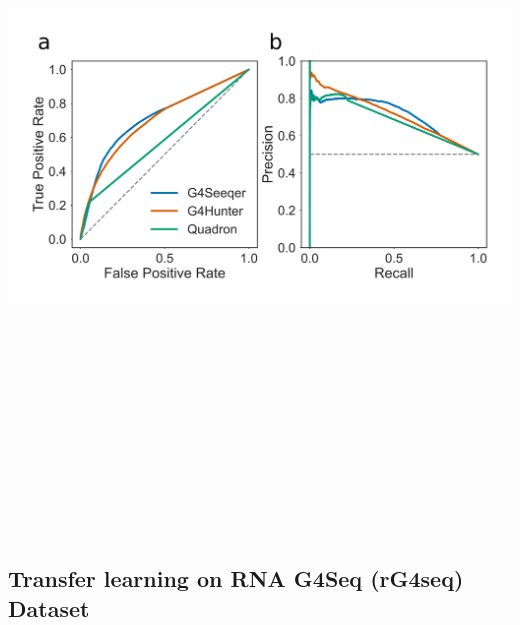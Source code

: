 \documentclass[12pt,a4paper,]{report}
\let\origfigure=\figure
\let\endorigfigure=\endfigure
\renewenvironment{figure}[1][2] {
    \expandafter\origfigure\expandafter[H]
} {
    \endorigfigure
}
\begin{document}
\newpage

\begin{figure}[htbp]
\centering
\includegraphics[width=\textwidth,height=562pt,keepaspectratio]{chapter_3/figures/bg4_roc.png}
\caption[Detection by BG4 peak sequences using G4Seeqer]{\textbf{Detection   by   BG4   peak   sequences   using   G4Seeqer}   \textbf{a)}   Receiver   Operator   Characteristic   (ROC)   curve   showing   the   performance   of   G4Seeqer,   Quadron,   and   the   G4Hunter   method,   on   BG4   ChIP-seq   peaks   and   randomly   shuffled   negative   sequences.   \label{bg4}}
\end{figure}

\newpage

\hypertarget{transfer-learning-on-rna-g4seq-rg4seq-dataset}{%
\subsection{Transfer learning on RNA G4Seq (rG4seq)
Dataset}\label{transfer-learning-on-rna-g4seq-rg4seq-dataset}}
\end{document}
